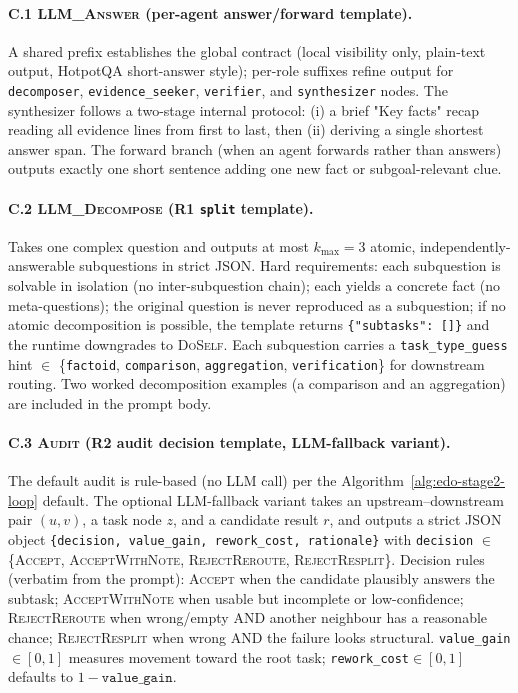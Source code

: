 \paragraph{C.1 \textsc{LLM\_Answer} (per-agent answer/forward template).}
A shared prefix establishes the global contract (local visibility only, plain-text output, HotpotQA short-answer style); per-role suffixes refine output for \texttt{decomposer}, \texttt{evidence\_seeker}, \texttt{verifier}, and \texttt{synthesizer} nodes. The synthesizer follows a two-stage internal protocol: (i) a brief "Key facts" recap reading all evidence lines from first to last, then (ii) deriving a single shortest answer span. The forward branch (when an agent forwards rather than answers) outputs exactly one short sentence adding one new fact or subgoal-relevant clue.

\paragraph{C.2 \textsc{LLM\_Decompose} (R1 \texttt{split} template).}
Takes one complex question and outputs at most $k_{\max}{=}3$ atomic, independently-answerable subquestions in strict JSON. Hard requirements: each subquestion is solvable in isolation (no inter-subquestion chain); each yields a concrete fact (no meta-questions); the original question is never reproduced as a subquestion; if no atomic decomposition is possible, the template returns \texttt{\{"subtasks": []\}} and the runtime downgrades to \textsc{DoSelf}. Each subquestion carries a \texttt{task\_type\_guess} hint $\in$ \{\texttt{factoid}, \texttt{comparison}, \texttt{aggregation}, \texttt{verification}\} for downstream routing. Two worked decomposition examples (a comparison and an aggregation) are included in the prompt body.

\paragraph{C.3 \textsc{Audit} (R2 audit decision template, LLM-fallback variant).}
The default audit is rule-based (no LLM call) per the Algorithm~\ref{alg:edo-stage2-loop} default. The optional LLM-fallback variant takes an upstream--downstream pair $(u, v)$, a task node $z$, and a candidate result $r$, and outputs a strict JSON object \texttt{\{decision, value\_gain, rework\_cost, rationale\}} with \texttt{decision} $\in$ \{\textsc{Accept}, \textsc{AcceptWithNote}, \textsc{RejectReroute}, \textsc{RejectResplit}\}. Decision rules (verbatim from the prompt): \textsc{Accept} when the candidate plausibly answers the subtask; \textsc{AcceptWithNote} when usable but incomplete or low-confidence; \textsc{RejectReroute} when wrong/empty AND another neighbour has a reasonable chance; \textsc{RejectResplit} when wrong AND the failure looks structural. \texttt{value\_gain}$\in[0,1]$ measures movement toward the root task; \texttt{rework\_cost}$\in[0,1]$ defaults to $1{-}\texttt{value\_gain}$.

